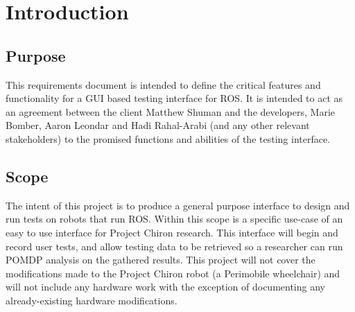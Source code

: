 \documentclass[onecolumn, draftclsnofoot,10pt, compsoc]{IEEEtran}
\begin{document}
\section{Introduction}
\subsection{Purpose}
This requirements document is intended to define the critical features and functionality for a GUI based testing interface for ROS. It is intended to act as an agreement between the client Matthew Shuman and the developers, Marie Bomber, Aaron Leondar and Hadi Rahal-Arabi (and any other relevant stakeholders) to the promised functions and abilities of the testing interface. 
\subsection{Scope}
The intent of this project is to produce a general purpose interface to design and run tests on robots that run ROS. Within this scope is a specific use-case of an easy to use interface for Project Chiron research. This interface will  begin and record user tests, and allow testing data to be retrieved so a researcher can run POMDP analysis on the gathered results. This project will not cover the modifications made to the Project Chiron robot (a Perimobile wheelchair) and will not include any hardware work with the exception of documenting any already-existing hardware modifications. 
\end{document}
